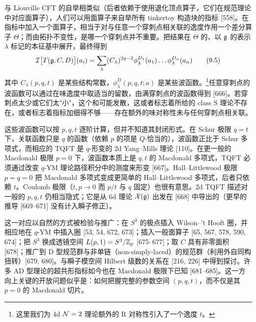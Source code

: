 与 Liouville CFT 的自举相类似（后者依赖于使用退化顶点算子，它们在规范理论中对应面算子），人们可以用面算子来自举所有 tinkertoy 构造块的指标 [558]。在指标中加入一个面算子，相当于对与任意一个穿刺点相关联的逸度作用一个差分算子 $\Theta$；而由拓扑不变性，是哪一个穿刺点并不重要。把结果在 $\Theta$ 的、以 $\mathfrak{g}$ 的表示 $\lambda$ 标记的本征基中展开，最终得到
\begin{equation}
\mathcal{I}\big[T(\mathfrak{g},C,D)\big](a_i)=\sum_\lambda (C_\lambda)^{2g-2}\phi^{D_1}_\lambda(a_1)\dots\phi^{D_n}_\lambda(a_n)
\tag{9.5}
\end{equation}
其中 $C_\lambda(p,q,t)$ 是某些结构常数，$\phi^D_\lambda(p,q,t;a)$ 是某些波函数。\footnote{这里我们为 4d $\mathcal{N}=2$ 理论额外的 R 对称性引入了一个逸度 $t$。}任意穿刺点的波函数可以通过在味逸度中取适当的留数，由满穿刺点的波函数得到 [666]。若穿刺点太少或它们太"小"，这个和可能发散，这或者标志着所给的 class S 理论不存在，或者标志着指标加细得不够------存在额外的味对称性未与任何穿刺点相关联。

这些波函数可以按 $p,q,t$ 逐阶计算，但并不知道其封闭形式。在 Schur 极限 $q=t$ 下，关联函数只是 $q$ 的函数（依赖 $p$ 的项是 $Q$-恰当的），波函数正比于 Schur 多项式，而相应的 TQFT 是 $q$-形变的 2d Yang--Mills 理论 [110]。在更一般的 Macdonald 极限 $p=0$ 下，波函数本质上是 $q,t$ 的 Macdonald 多项式，TQFT 必须通过改变 $q$-YM 理论路径积分中的测度来形变 [667]。Hall--Littlewood 极限 $p=q=0$ 把 Macdonald 多项式变成更简单的 Hall--Littlewood 多项式，后者只依赖 $t$。Coulomb 极限（$t,p\to 0$ 而 $p/t$ 与 $q$ 固定）也很有意思。2d TQFT 描述对一般的 $p,q,t$ 仍相当隐式；它是从 6d 理论 $\mathcal{X}(\mathfrak{g})$ 出发在 [668] 中导出的（更早的推导 [669--671] 没有计入瞬子修正）。

这一对应以自然的方式被检验与推广：在 $S^3$ 的极点插入 Wilson--'t Hooft 圈，并相应地在 $q$-YM 中插入圈 [53, 54, 672, 673]；插入一般面算子 [65, 567, 578, 590, 674]；把 $S^3$ 换成透镜空间 $L(p,1)=S^3/\mathbb{Z}_p$ [675--677]；取 $C$ 具有非零面积 [678]；推广到 D 型规范群与非单链（non-simply-laced）的规范群（利用外自同构扭转）[679, 680]。与瞬子模空间 Hilbert 级数的关系在 [216, 226] 中得到探讨。许多 AD 型理论的超共形指标如今也在 Macdonald 极限下已知 [681--685]。这一方向上关键的开放问题似乎是：如何把握完整的参数空间 $(p,q,t)$，而不仅是其 $p=0$ 的 Macdonald 切片。


